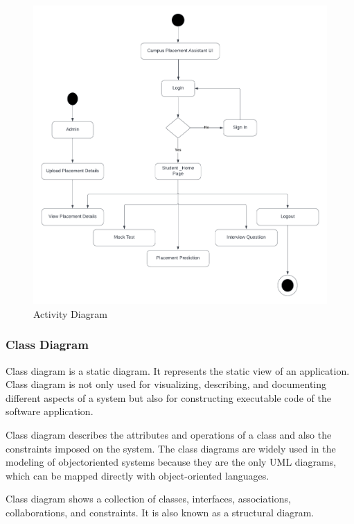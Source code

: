 \documentclass[12pt]{article}
\begin{document}
\vspace*{10px}
\begin{figure}[h!]
\begin{center}
\includegraphics[scale=.8]{Activity diagram}
\caption{Activity Diagram}
\end{center}
\end{figure}
\newpage
\subsubsection{Class Diagram}

Class diagram is a static diagram. It represents the static view of an application. Class diagram is not only used for visualizing, describing, and documenting different aspects of a system but also for constructing executable code of the software application.

Class diagram describes the attributes and operations of a class and also the constraints imposed on the system. The class diagrams are widely used in the modeling of objectoriented systems because they are the only UML diagrams, which can be mapped directly with object-oriented languages.

Class diagram shows a collection of classes, interfaces, associations, collaborations, and constraints. It is also known as a structural diagram.
\end{document}
